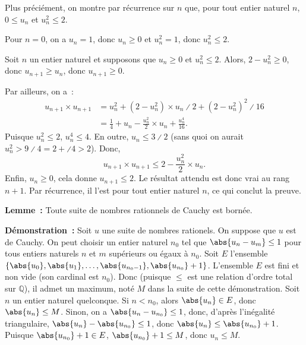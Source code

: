 \begin{tcolorbox}
    Plus préciément, on montre par récurrence sur $n$ que, pour tout entier naturel $n$, $0 \leq u_n$ et $u_n^2 \leq 2$.
    
    \medskip

    Pour $n = 0$, on a $u_n = 1$, donc $u_n \geq 0$ et $u_n^2 = 1$, donc $u_n^2 \leq 2$. 

    Soit $n$ un entier naturel et supposons que $u_n \geq 0$ et $u_n^2 \leq 2$. 
    Alors, $2 - u_n^2 \geq 0$, donc $u_{n+1} \geq u_n$, donc $u_{n+1} \geq 0$.
    
    Par ailleurs, on a : 
    \begin{equation*} \begin{aligned}
        u_{n+1} \times u_{n+1} 
         & = u_n^2 + \left(2 - u_n^2 \right) \times u_n \divslash 2 + \left(2 - u_n^2 \right)^2 \divslash 16 \\
         & = \frac{1}{4} + u_n - \frac{u_n^2}{2} \times u_n + \frac{u_n^4}{16} .
    \end{aligned}\end{equation*}
    Puisque $u_n^2 \leq 2$, $u_n^4 \leq 4$.
    En outre, $u_n \leq 3 \divslash 2$ (sans quoi on aurait $u_n^2 > 9 \divslash 4 = 2 + \divslash 4 > 2$).
    Donc, 
    \begin{equation*}
        u_{n+1} \times u_{n+1} \leq 2 - \frac{u_n^2}{2} \times u_n.
    \end{equation*}
    Enfin, $u_n \geq 0$, cela donne $u_{n+1} \leq 2$.
    Le résultat attendu est donc vrai au rang $n+1$.
    Par récurrence, il l'est pour tout entier naturel $n$, ce qui conclut la preuve.
\end{tcolorbox}

\medskip

\noindent\textbf{Lemme :} Toute suite de nombres rationnels de Cauchy est bornée. 

\medskip

\noindent\textbf{Démonstration :} 
    Soit $u$ une suite de nombres rationels. 
    On suppose que $u$ est de Cauchy. 
    On peut choisir un entier naturel $n_0$ tel que $\abs{u_n - u_m} \leq 1$ pour tous entiers naturels $n$ et $m$ supérieurs ou égaux à $n_0$. 
    Soit $E$ l'ensemble $\lbrace \abs{u_0}, \abs{u_1}, \dots, \abs{u_{n_0 - 1}}, \abs{u_{n_0}} + 1 \rbrace$. 
    L'ensemble $E$ est fini et non vide (son cardinal est $n_0$). Donc (puisque $\leq$ est une relation d'ordre total sur $\mathbb{Q}$), il admet un maximum, noté $M$ dans la suite de cette démonstration.
    Soit $n$ un entier naturel quelconque. 
    Si $n < n_0$, alors $\abs{u_n} \in E$, donc $\abs{u_n} \leq M$.
    Sinon, on a $\abs{u_n - u_{n_0}} \leq 1$, donc, d'après l'inégalité triangulaire, $\abs{u_n} - \abs{u_{n_0}} \leq 1$, donc $\abs{u_n} \leq \abs{u_{n_0}} + 1$.
    Puisque $\abs{u_{n_0}} + 1 \in E$, $\abs{u_{n_0}} + 1 \leq M$, donc $u_n \leq M$. 

